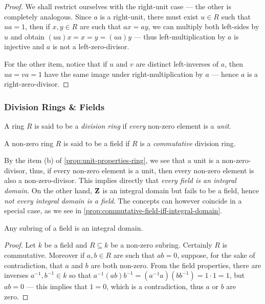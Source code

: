 %
\begin{proof}
We shall restrict ourselves with the right-unit case --- the other is completely
analogous. Since \(a\) is a right-unit, there must exist \(u \in R\) such that
\(u a = 1\), then if \(x, y \in R\) are such that \(a x = a y\), we can multiply
both left-sides by \(u\) and obtain \((u a) x = x = y = (u a) y\) --- thus
left-multiplication by \(a\) is injective and \(a\) is not a left-zero-divisor.

For the other item, notice that if \(u\) and \(v\) are distinct left-inverses of
\(a\), then \(u a = v a = 1\) have the same image under right-multiplication by
\(a\) --- hence \(a\) is a right-zero-divisor.
\end{proof}
%

\subsubsection{Division Rings \& Fields}

%
\begin{definition}
\label{def:division-ring}
A ring \(R\) is said to be a \emph{division ring} if \emph{every} non-zero
element is a \emph{unit}.
\end{definition}
%

%
\begin{definition}[Field]
\label{def:field}
A non-zero ring \(R\) is said to be a field if \(R\) is a \emph{commutative}
division ring.
\end{definition}
%

%
\begin{remark}
\label{rem:field-and-integral-domain}
By the item (b) of \cref{prop:unit-properties-ring}, we see that a unit is a
non-zero-divisor, thus, if every non-zero element is a unit, then every non-zero
element is also a non-zero-divisor. This implies directly that \emph{every field
is an integral domain}. On the other hand, \(\mathbf{Z}\) is an integral domain but fails
to be a field, hence \emph{not every integral domain is a field}. The concepts
can however coincide in a special case, as we see in
\cref{prop:commutative-field-iff-integral-domain}.
\end{remark}
%

%
\begin{proposition}
\label{prop:subring-field-is-integral-domain}
Any subring of a field is an integral domain.
\end{proposition}
%

%
\begin{proof}
Let \(k\) be a field and \(R \subseteq k\) be a non-zero subring. Certainly
\(R\) is commutative. Moreover if \(a, b \in R\) are such that \(a b = 0\),
suppose, for the sake of contradiction, that \(a\) and \(b\) are both
non-zero. From the field properties, there are inverses \(a^{-1}, b^{-1} \in k\)
so that \(a^{-1}(a b) b^{-1} = (a^{-1} a) (b b^{-1}) = 1 \cdot 1 = 1\), but \(a
b = 0\) --- this implies that \(1 = 0\), which is a contradiction, thus \(a\) or
\(b\) are zero.
\end{proof}
%

